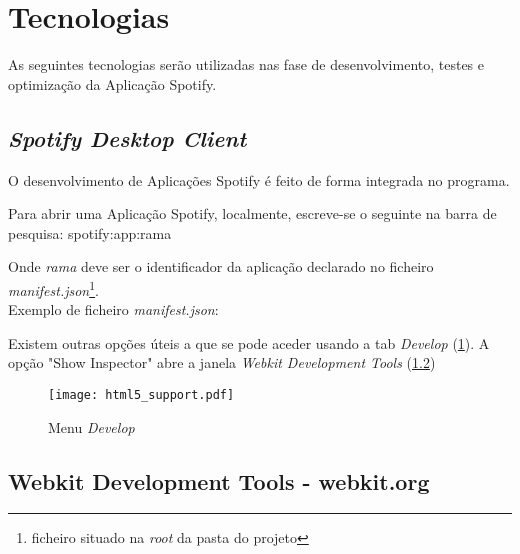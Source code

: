 

\section{Tecnologias} %
\label{sec:tecnologias}

  As seguintes tecnologias serão utilizadas nas fase de desenvolvimento, testes e optimização da Aplicação Spotify.

  \subsection{\emph{Spotify Desktop Client}} %
  \label{sub:subsection_name}
    O desenvolvimento de Aplicações Spotify é feito de forma integrada no programa.

    Para abrir uma Aplicação Spotify, localmente, escreve-se o seguinte na barra de pesquisa: spotify:app:rama

    Onde \emph{rama} deve ser o identificador da aplicação declarado no ficheiro \emph{manifest.json}\footnote{ficheiro situado na \emph{root} da pasta do projeto}. \\
    Exemplo de ficheiro \emph{manifest.json}:

    

    Existem outras opções úteis a que se pode aceder usando a tab \emph{Develop} (\ref{fig:html5_support}).
    A opção "Show Inspector" abre a janela \emph{Webkit Development Tools} (\ref{sub:webkit_tools})

    \begin{figure}
      \begin{center}
        \texttt{[image: html5\_support.pdf]}
      \end{center}
      \caption{Menu \emph{Develop}}
      \label{fig:html5_support}
    \end{figure}
  

  \subsection{Webkit Development Tools - webkit.org} %
  \label{sub:webkit_tools}

